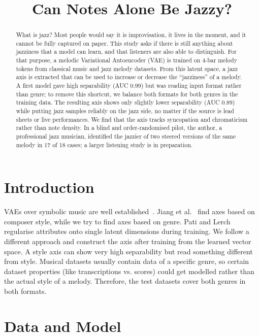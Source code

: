 \documentclass{article}
\title{Can Notes Alone Be Jazzy?}
\begin{document}
\maketitle

\begin{abstract}
What is jazz? Most people would say it is improvisation, it lives in the moment, 
and it cannot be fully captured
on paper. This study asks if there is still anything about jazziness that a model 
can learn, and that listeners are also able to distinguish.
For that purpose, a melodic Variational Autoencoder (VAE) is trained on 4-bar 
melody tokens from classical music and jazz melody datasets.
From this latent space, a jazz axis is extracted that can be used
to increase or decrease the ``jazziness'' of a melody.
A first model gave high separability (AUC 0.99) but was reading input format rather than genre; 
to remove this shortcut, we balance both formats for both genres in the training data.
The resulting axis shows only slightly lower separability
(AUC 0.89) while putting jazz samples reliably on the jazz side, no matter if the 
source is lead sheets or live performances.
We find that the axis tracks syncopation and chromaticism
rather than note density.
In a blind and order-randomised pilot, the author, a professional 
jazz musician, identified the jazzier of two steered versions of the same 
melody in 17 of 18 cases;
a larger listening study is in preparation.
\end{abstract}

\section{Introduction}\label{sec:introduction}

VAEs over symbolic music are well established~\cite{roberts2018musicvae}.
Jiang et al.~\cite{jiang2025composervector} find axes based on composer style, while we try
to find axes based on genre.
Pati and Lerch~\cite{pati2021attribute} regularise attributes onto single latent 
dimensions during training. We follow a different approach and construct the axis
after training from the learned vector space. A style axis can show very high separability but read
something different from style. Musical datasets usually contain data of a specific genre,
so certain dataset properties (like transcriptions vs. scores) could get modelled rather 
than the actual style of a melody.
Therefore, the test datasets cover both genres in both formats.


\section{Data and Model}\label{sec:data}
\end{document}

